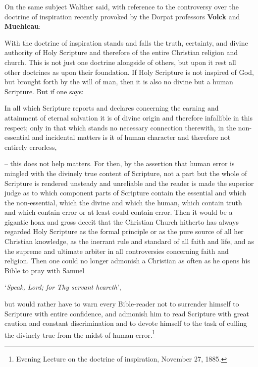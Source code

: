On the same subject Walther said, with reference to the controversy over the doctrine of inspiration recently provoked by the Dorpat professors \textbf{Volck} and \textbf{Muehleau}: \begin{fancyquotes} With the doctrine of inspiration stands and falls the truth, certainty, and divine authority of Holy Scripture and therefore of the entire Christian religion and church.  This is not just one doctrine alongside of others, but upon it rest all other doctrines as upon their foundation.  If Holy Scripture is not inspired of God, but brought forth by the will of man, then it is also no divine but a human Scripture.  But if one says: \begin{displayquote}{\footnotesize In all which Scripture reports and declares concerning the earning and attainment of eternal salvation it is of divine origin and therefore infallible in this respect; only in that which stands no necessary connection therewith, in the non-essential and incidental matters is it of human character and therefore not entirely errorless,}\end{displayquote} -- this does not help matters.  For then, by the assertion that human error is mingled with the divinely true content of Scripture, not a part but the whole of Scripture is rendered unsteady and unreliable and the reader is made the superior judge as to which component parts of Scripture contain the essential and which the non-essential, which the divine and which the human, which contain truth and which contain error or at least could contain error.  Then it would be a gigantic hoax and gross deceit that the Christian Church hitherto has always regarded Holy Scripture as the formal principle or as the pure source of all her Christian knowledge, as the inerrant rule and standard of all faith and life, and as the supreme and ultimate arbiter in all controversies concerning faith and religion.  Then one could no longer admonish a Christian as often as he opens his Bible to pray with Samuel \begin{displayquote}‘\textit{Speak, Lord; for Thy servant heareth}’,\end{displayquote} but would rather have to warn every Bible-reader not to surrender himself to Scripture with entire confidence, and admonish him to read Scripture with great caution and constant discrimination and to devote himself to the task of culling the divinely true from the midst of human error.\footnote{Evening Lecture on the doctrine of inspiration, November 27, 1885.}\end{fancyquotes}


